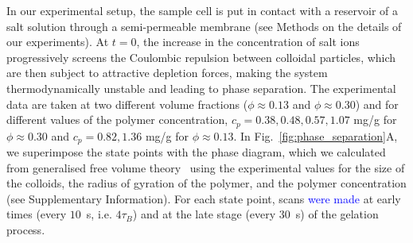 \documentclass[12pt]{article}
\begin{document}
In our experimental setup, the sample cell is put in contact with a reservoir of a salt solution through a semi-permeable membrane (see Methods 
on the details of our experiments).
At $t=0$, the increase in the concentration of salt ions progressively screens the Coulombic repulsion between colloidal particles,
which are then subject to attractive depletion forces, making the system thermodynamically unstable and leading to phase separation. 
The experimental data are taken at two different volume fractions ($\phi\approx 0.13$ and $\phi\approx 0.30$) and for different values
of the polymer concentration, $c_p=0.38,0.48,0.57,1.07$ mg/g for $\phi\approx 0.30$ and $c_p=0.82,1.36$ mg/g for $\phi\approx 0.13$.
In Fig.~\ref{fig:phase_separation}A, we superimpose the state points with the phase diagram, which we calculated from generalised free volume theory~\cite{Fleer2008} using the experimental values for the size of the colloids, the radius of gyration of the polymer, and the polymer concentration (see Supplementary Information).
For each state point, scans \textcolor{blue}{were made} at early times (every $10$~s, i.e. $4\tau_B$) and at the late stage (every $30$~s) of the gelation process. 
\end{document}
